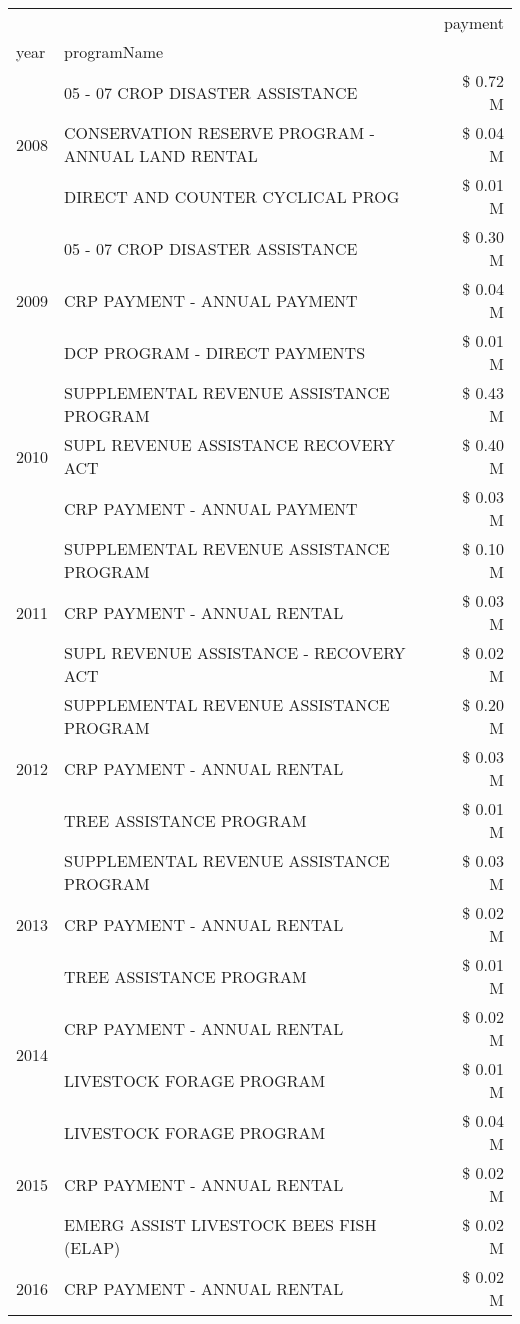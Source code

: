 \begin{tabular}{llr}
\toprule
 &  & payment \\
year & programName &  \\
\midrule
\multirow[t]{3}{*}{2008} & 05 - 07 CROP DISASTER ASSISTANCE & \$ 0.72 M \\
 & CONSERVATION RESERVE PROGRAM - ANNUAL LAND RENTAL & \$ 0.04 M \\
 & DIRECT AND COUNTER CYCLICAL PROG & \$ 0.01 M \\
\cline{1-3}
\multirow[t]{3}{*}{2009} & 05 - 07 CROP DISASTER ASSISTANCE & \$ 0.30 M \\
 & CRP PAYMENT - ANNUAL PAYMENT & \$ 0.04 M \\
 & DCP PROGRAM - DIRECT PAYMENTS & \$ 0.01 M \\
\cline{1-3}
\multirow[t]{3}{*}{2010} & SUPPLEMENTAL REVENUE ASSISTANCE PROGRAM & \$ 0.43 M \\
 & SUPL REVENUE ASSISTANCE RECOVERY ACT & \$ 0.40 M \\
 & CRP PAYMENT - ANNUAL PAYMENT & \$ 0.03 M \\
\cline{1-3}
\multirow[t]{3}{*}{2011} & SUPPLEMENTAL REVENUE ASSISTANCE PROGRAM & \$ 0.10 M \\
 & CRP PAYMENT - ANNUAL RENTAL & \$ 0.03 M \\
 & SUPL REVENUE ASSISTANCE - RECOVERY ACT & \$ 0.02 M \\
\cline{1-3}
\multirow[t]{3}{*}{2012} & SUPPLEMENTAL REVENUE ASSISTANCE PROGRAM & \$ 0.20 M \\
 & CRP PAYMENT - ANNUAL RENTAL & \$ 0.03 M \\
 & TREE ASSISTANCE PROGRAM & \$ 0.01 M \\
\cline{1-3}
\multirow[t]{3}{*}{2013} & SUPPLEMENTAL REVENUE ASSISTANCE PROGRAM & \$ 0.03 M \\
 & CRP PAYMENT - ANNUAL RENTAL & \$ 0.02 M \\
 & TREE ASSISTANCE PROGRAM & \$ 0.01 M \\
\cline{1-3}
\multirow[t]{2}{*}{2014} & CRP PAYMENT - ANNUAL RENTAL & \$ 0.02 M \\
 & LIVESTOCK FORAGE PROGRAM & \$ 0.01 M \\
\cline{1-3}
\multirow[t]{3}{*}{2015} & LIVESTOCK FORAGE PROGRAM & \$ 0.04 M \\
 & CRP PAYMENT - ANNUAL RENTAL & \$ 0.02 M \\
 & EMERG ASSIST LIVESTOCK BEES FISH (ELAP) & \$ 0.02 M \\
\cline{1-3}
\multirow[t]{3}{*}{2016} & CRP PAYMENT - ANNUAL RENTAL & \$ 0.02 M \\

\end{tabular}

